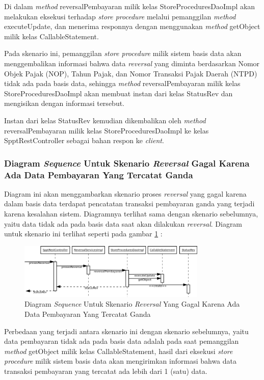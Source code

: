 \documentclass[pdftex,12pt, oneside]{article}
\begin{document}
Di dalam \textit{method} reversalPembayaran milik kelas StoreProceduresDaoImpl akan melakukan eksekusi terhadap \textit{store procedure} melalui pemanggilan \textit{method} executeUpdate, dan menerima responnya dengan menggunakan \textit{method} getObject milik kelas CallableStatement.

Pada skenario ini, pemanggilan \textit{store procedure} milik sistem basis data akan menggembalikan informasi bahwa data \textit{reversal} yang diminta berdasarkan Nomor Objek Pajak (NOP), Tahun Pajak, dan Nomor Transaksi Pajak Daerah (NTPD) tidak ada pada basis data, sehingga \textit{method} reversalPembayaran milik kelas StoreProceduresDaoImpl akan membuat instan dari kelas StatusRev dan mengisikan dengan informasi tersebut.

Instan dari kelas StatusRev kemudian dikembalikan oleh \textit{method} reversalPembayaran milik kelas StoreProceduresDaoImpl ke kelas SpptRestController sebagai bahan respon ke \textit{client}.

\subsubsection{Diagram \textit{Sequence} Untuk Skenario \textit{Reversal} Gagal Karena Ada Data Pembayaran Yang Tercatat Ganda}

Diagram ini akan menggambarkan skenario proses \textit{reversal} yang gagal karena dalam basis data terdapat pencatatan transaksi pembayaran ganda yang terjadi karena kesalahan sistem. Diagramnya terlihat sama dengan skenario sebelumnya, yaitu data tidak ada pada basis data saat akan dilakukan \textit{reversal}. Diagram untuk skenario ini terlihat seperti pada gambar \ref{fig:uml-seq-rev-double} :

\begin{figure}[H]
  \centering
  \includegraphics[width=0.8\textwidth]{./resources/uml/uml-seq-rev-null}
  \caption{Diagram \textit{Sequence} Untuk Skenario \textit{Reversal} Yang Gagal Karena Ada Data Pembayaran Yang Tercatat Ganda}
  \label{fig:uml-seq-rev-double}
\end{figure}

Perbedaan yang terjadi antara skenario ini dengan skenario sebelumnya, yaitu data pembayaran tidak ada pada basis data adalah pada saat pemanggilan \textit{method} getObject milik kelas CallableStatement, hasil dari eksekusi \textit{store procedure} milik sistem basis data akan mengirimkan informasi bahwa data transaksi pembayaran yang tercatat ada lebih dari 1 (satu) data.
\end{document}
